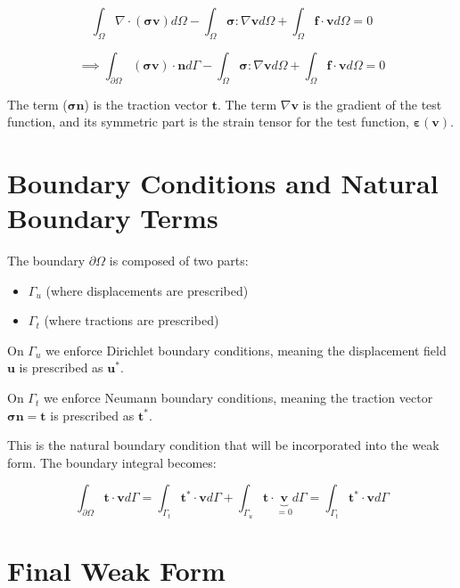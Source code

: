 \documentclass[
  11pt,
  a4paper,
]{scrbook}
\providecommand{\tightlist}{%
  \setlength{\itemsep}{0pt}\setlength{\parskip}{0pt}}\usepackage{longtable,booktabs,array}
\begin{document}
\[\int_{\Omega} \nabla \cdot (\boldsymbol{\sigma}\mathbf{v}) d\Omega - \int_{\Omega} \boldsymbol{\sigma} : \nabla\mathbf{v} d\Omega + \int_{\Omega} \mathbf{f} \cdot \mathbf{v} d\Omega = 0\]

\[\implies \int_{\partial\Omega} (\boldsymbol{\sigma}\mathbf{v}) \cdot \mathbf{n} d\Gamma - \int_{\Omega} \boldsymbol{\sigma} : \nabla\mathbf{v} d\Omega + \int_{\Omega} \mathbf{f} \cdot \mathbf{v} d\Omega = 0\]

The term (\(\boldsymbol{\sigma}\boldsymbol{n}\)) is the traction vector
\(\boldsymbol{t}\). The term \(\nabla \boldsymbol{v}\) is the gradient
of the test function, and its symmetric part is the strain tensor for
the test function, \(\boldsymbol{\varepsilon}(\boldsymbol{v})\).

\section{Boundary Conditions and Natural Boundary
Terms}\label{boundary-conditions-and-natural-boundary-terms}

The boundary \(\partial \Omega\) is composed of two parts:

\begin{itemize}
\tightlist
\item
  \(\Gamma_u\) (where displacements are prescribed)
\item
  \(\Gamma_t\) (where tractions are prescribed)
\end{itemize}

On \(\Gamma_u\) we enforce Dirichlet boundary conditions, meaning the
displacement field \(\mathbf{u}\) is prescribed as \(\mathbf{u}^*\).

On \(\Gamma_t\) we enforce Neumann boundary conditions, meaning the
traction vector \(\boldsymbol{\sigma n}=\boldsymbol{t}\) is prescribed
as \(\boldsymbol{t}^*\).

This is the natural boundary condition that will be incorporated into
the weak form. The boundary integral becomes:

\[\int_{\partial\Omega} \mathbf{t} \cdot \mathbf{v} d\Gamma = \int_{\Gamma_t} \mathbf{t}^* \cdot \mathbf{v} d\Gamma + \int_{\Gamma_u} \mathbf{t} \cdot \underbrace{\mathbf{v}}_{=0} d\Gamma = \int_{\Gamma_t} \mathbf{t}^* \cdot \mathbf{v} d\Gamma\]

\section{Final Weak Form}\label{final-weak-form-1}
\end{document}
